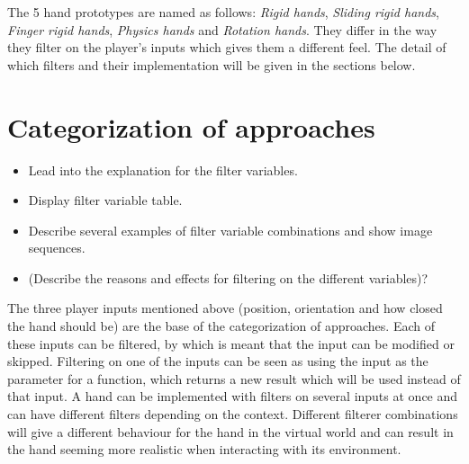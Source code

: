 The 5 hand prototypes are named as follows: \textit{Rigid hands}, \textit{Sliding rigid hands}, \textit{Finger rigid hands}, \textit{Physics hands} and \textit{Rotation hands}. They differ in the way they filter on the player’s inputs which gives them a different feel. The detail of which filters and their implementation will be given in the sections below.


\section{Categorization of approaches}
\label{sec:categorizationOfApproaches}
\begin{itemize}
\item Lead into the explanation for the filter variables.
\item Display filter variable table.
\item Describe several examples of filter variable combinations and show image sequences.
\item (Describe the reasons and effects for filtering on the different variables)?
\end{itemize}

The three player inputs mentioned above (position, orientation and how closed the hand should be) are the base of the categorization of approaches. Each of these inputs can be filtered, by which is meant that the input can be modified or skipped. Filtering on one of the inputs can be seen as using the input as the parameter for a function, which returns a new result which will be used instead of that input. A hand can be implemented with filters on several inputs at once and can have different filters depending on the context. Different filterer combinations will give a different behaviour for the hand in the virtual world and can result in the hand seeming more realistic when interacting with its environment.

